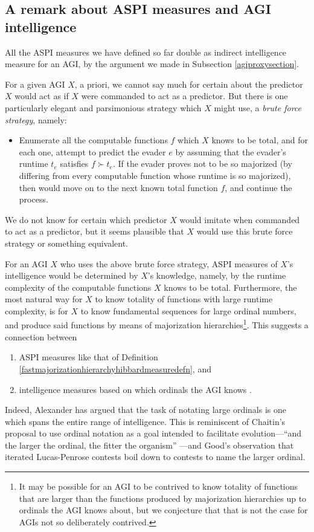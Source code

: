 \documentclass{article}
\begin{document}
\subsection{A remark about ASPI measures and AGI intelligence}

All the ASPI measures we have defined so far double as indirect intelligence
measure for an AGI, by the argument we made in Subsection \ref{agiproxysection}.

For a given AGI $X$, a priori, we cannot say much for certain about the predictor $X$
would act as if $X$ were commanded to act as a predictor. But there is one particularly
elegant and parsimonious strategy which $X$ might use, a \emph{brute force strategy},
namely:
\begin{itemize}
    \item Enumerate all the
    computable functions $f$ which $X$ knows to be total, and for each one, attempt to
    predict the evader $e$ by assuming that the evader's runtime $t_e$
    satisfies $f\succ t_e$.
    If the evader proves not to be so majorized (by differing from every computable
    function whose runtime is so majorized), then would move on to the next
    known total function $f$, and continue the process.
\end{itemize}
We do not
know for certain which predictor $X$ would imitate when commanded to act as a predictor,
but it seems plausible that $X$ would use this brute force strategy or something
equivalent.

For an AGI $X$ who uses the above brute force strategy, ASPI
measures of $X$'s intelligence would be determined by $X$'s knowledge, namely,
by the runtime complexity of the computable functions $X$ knows to be total.
Furthermore, the most natural way for $X$ to know totality of functions with large
runtime complexity, is for $X$ to know fundamental sequences for large ordinal
numbers, and produce said functions by means of majorization
hierarchies\footnote{It may be
possible for an AGI to be contrived to know totality of functions that are larger
than the functions produced by majorization hierarchies up to ordinals the AGI knows
about, but we conjecture that that is not the case for AGIs not so deliberately
contrived.}. This suggests a connection between
\begin{enumerate}
    \item
    ASPI measures like that of
    Definition \ref{fastmajorizationhierarchyhibbardmeasuredefn}, and
    \item
    intelligence measures based on which ordinals the AGI knows
    \cite{ioi1}.
\end{enumerate}
Indeed, Alexander has argued \cite{ioi2} that
the task of notating large ordinals is one which
spans the entire range of intelligence.
This is reminiscent of Chaitin's proposal to use ordinal notation
as a goal intended to facilitate evolution---``and the larger the ordinal,
the fitter the organism'' \cite{chaitin}---and Good's observation
\cite{good1969godel} that iterated Lucas-Penrose contests boil down to
contests to name the larger ordinal.
\end{document}
